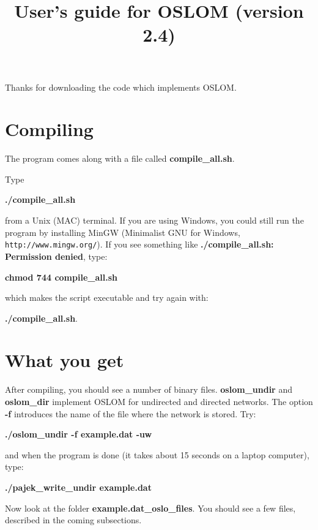 \documentclass[11pt]{article}
\title{User's guide for OSLOM (version 2.4)}
\begin{document}
\maketitle

Thanks for downloading the code which implements OSLOM.


\section{Compiling}

The program comes along with a file called \textbf{compile\_all.sh}.

Type  

{ \textbf{./compile\_all.sh} }

from a Unix (MAC) terminal. If you are using Windows, you could still run
the program by installing MinGW
(Minimalist GNU for Windows, {\tt http://www.mingw.org/}).
If you see something like \textbf{./compile\_all.sh: Permission denied}, type:

\textbf{chmod 744 compile\_all.sh} 

which makes the script executable and try again with:

\textbf{./compile\_all.sh}. 

\section{What you get}

After compiling, you should see a number of binary
files. \textbf{oslom\_undir} and \textbf{oslom\_dir} 
implement OSLOM for undirected and directed networks. The option {\bf
  -f} introduces the name of the file where the network is stored. Try:

{ \textbf{./oslom\_undir -f example.dat -uw} }

and when the program is done (it takes about 15 seconds on a laptop computer), type: 

{ \textbf{./pajek\_write\_undir example.dat}}

Now look at the folder \textbf{example.dat\_oslo\_files}. You should
see a few files, described in the coming subsections.
\end{document}
